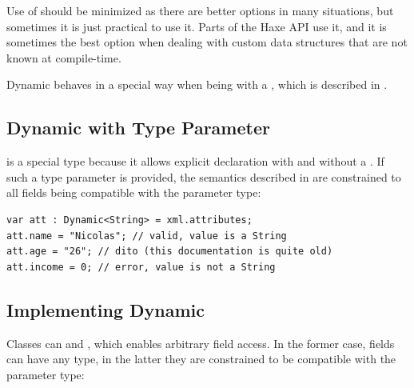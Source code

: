 \documentclass{haxe}
\begin{document}

Use of  should be minimized as there are better options in many situations, but sometimes it is just practical to use it. Parts of the Haxe  API use it, and it is sometimes the best option when dealing with custom data structures that are not known at compile-time.

Dynamic behaves in a special way when being  with a , which is described in .


\subsection{Dynamic with Type Parameter}
\label{types-dynamic-with-type-parameter}

 is a special type because it allows explicit declaration with and without a . If such a type parameter is provided, the semantics described in  are constrained to all fields being compatible with the parameter type:

\begin{lstlisting}
var att : Dynamic<String> = xml.attributes;
att.name = "Nicolas"; // valid, value is a String
att.age = "26"; // dito (this documentation is quite old)
att.income = 0; // error, value is not a String
\end{lstlisting}


\subsection{Implementing Dynamic}
\label{types-dynamic-implemented}

Classes can   and , which enables arbitrary field access. In the former case, fields can have any type, in the latter they are constrained to be compatible with the parameter type:
\end{document}
